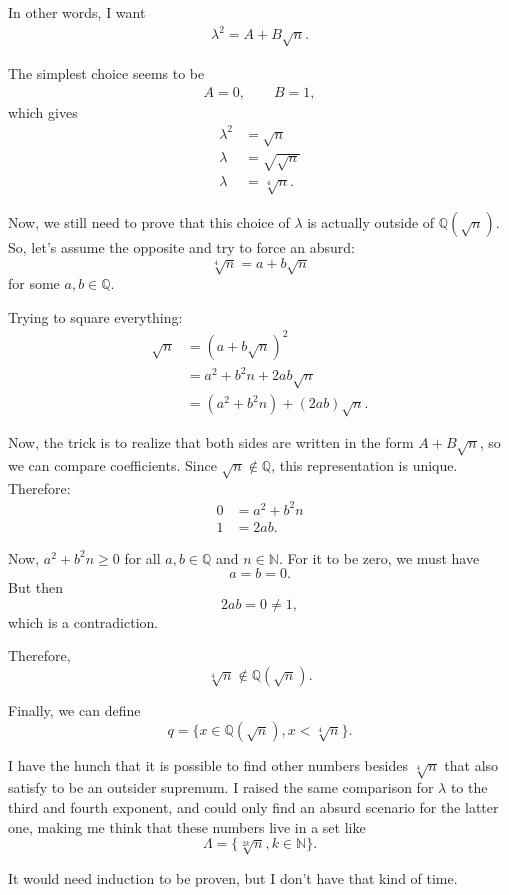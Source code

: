 \begin{solution}
In other words, I want
\begin{align*}
\lambda^2=A+B\sqrt{n}.
\end{align*}

The simplest choice seems to be
\begin{align*}
A=0,\qquad B=1,
\end{align*}
which gives
\begin{align*}
\lambda^2&=\sqrt{n}\\
\lambda&=\sqrt{\sqrt{n}}\\
\lambda&=\sqrt[4]{n}.
\end{align*}

Now, we still need to prove that this choice of $\lambda$ is actually outside of $\mathbb{Q}(\sqrt{n})$. So, let's assume the opposite and try to force an absurd:
$$
\sqrt[4]{n}=a+b\sqrt{n}
$$
for some $a,b\in\mathbb{Q}$.

Trying to square everything:
\begin{align*}
\sqrt{n}&=(a+b\sqrt{n})^2\\
&=a^2+b^2n+2ab\sqrt{n}\\
&=(a^2+b^2n)+(2ab)\sqrt{n}.
\end{align*}

Now, the trick is to realize that both sides are written in the form $A+B\sqrt{n}$, so we can compare coefficients. Since $\sqrt{n}\notin\mathbb{Q}$, this representation is unique. Therefore:
\begin{align*}
0&=a^2+b^2n\\
1&=2ab.
\end{align*}

Now, $a^2+b^2n\geq0$ for all $a,b\in\mathbb{Q}$ and $n\in\mathbb{N}$. For it to be zero, we must have
$$
a=b=0.
$$
But then
$$
2ab=0\neq1,
$$
which is a contradiction.

Therefore,
$$
\sqrt[4]{n}\notin\mathbb{Q}(\sqrt{n}).
$$

Finally, we can define
$$
q=\{x\in\mathbb{Q}(\sqrt{n}),x<\sqrt[4]{n}\}.
$$

I have the hunch that it is possible to find other numbers besides $\sqrt[4]{n}$ that also satisfy to be an outsider supremum. I raised the same comparison for $\lambda$ to the third and fourth exponent, and could only find an absurd scenario for the latter one, making me think that these numbers live in a set like
$$
\Lambda=\{\sqrt[2k]{n},k\in\mathbb{N}\}.
$$

It would need induction to be proven, but I don't have that kind of time.
\end{solution}

